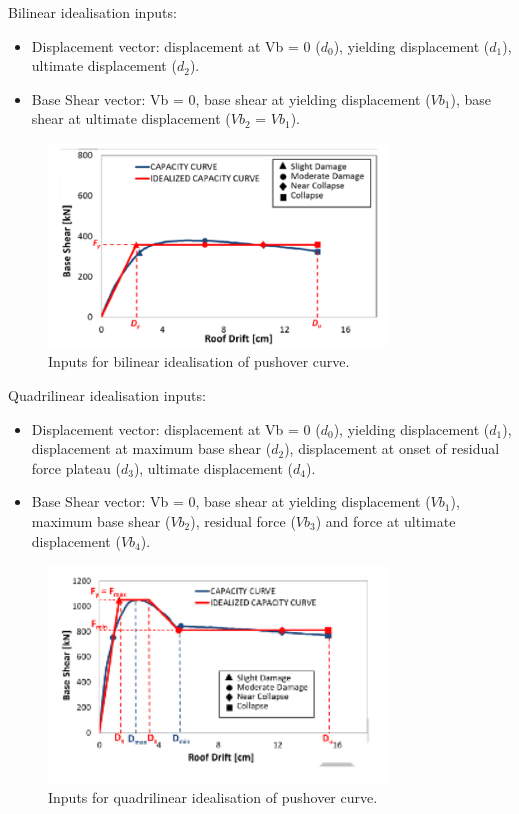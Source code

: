 Bilinear idealisation inputs:
\begin{itemize}
\item Displacement vector: displacement at Vb = 0 ($d_0$), yielding displacement ($d_1$), ultimate displacement ($d_2$).
\item Base Shear vector: Vb = 0, base shear at yielding displacement ($Vb_1$), base shear at ultimate displacement ($Vb_2$ = $Vb_1$).\\
\end{itemize}
\begin{figure}[htb]
  \centering
      \includegraphics[width=9cm]{Figures/bilinear.jpg}
  \caption{Inputs for bilinear idealisation of pushover curve.}
  \label{fig:bilinear}
\end{figure}

Quadrilinear idealisation inputs:
\begin{itemize}
\item Displacement vector: displacement at Vb = 0 ($d_0$), yielding displacement ($d_1$), displacement at maximum base shear ($d_2$), displacement at onset of residual force plateau ($d_3$), ultimate displacement ($d_4$).
\item Base Shear vector: Vb = 0, base shear at yielding displacement ($Vb_1$), maximum base shear ($Vb_2$), residual force ($Vb_3$) and force at ultimate displacement ($Vb_4$).\\
\end{itemize} 

\begin{figure}[htb]
  \centering
      \includegraphics[width=9cm]{Figures/quadrilinear.jpg}
  \caption{Inputs for quadrilinear idealisation of pushover curve.}
  \label{fig:quadrilinear}
\end{figure}

